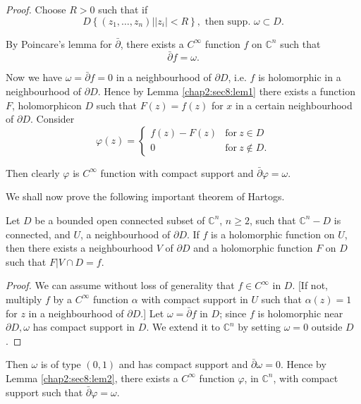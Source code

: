 \noindent\textit{Proof.}
  Choose $R > 0$ such that if
  \begin{equation*}
  D \left\{ (z_1, \ldots , z_n) \Big| |z_i| < R \right\}, \text{ then supp. }
  \omega \subset D.\tag*{$\Box$} 
  \end{equation*}

By Poincare's lemma for $\bar{\partial}$, there exists a $C^\infty$
function $f$ on $\mathbb{C}^n$ such that  
$$
\bar{\partial} f = \omega.
$$

Now we have $\omega = \bar{\partial} f = 0$ in a neighbourhood of
$\partial D$, i.e. $f$ is holomorphic in a neighbourhood of $\partial
D$. Hence by Lemma \ref{chap2:sec8:lem1} there exists a function $F$,
holomorphic\pageoriginale on $D$ 
such that $F(z) = f(z)$ for $x$ in a certain neighbourhood of
$\partial D$. Consider 
$$
\varphi (z) = \begin{cases} f(z) - F (z) & \text{for}~
  z \in D \\0 & \text{for}~ z \notin D. 
\end{cases}
$$ 

Then clearly $\varphi$ is
$C^\infty$ function with compact support and $\bar{\partial} \varphi =
\omega$. 

We shall now prove the following important theorem of Hartogs.

\setcounter{theorem}{0}
\begin{theorem}[Hartogs]\label{chap2:sec8:thm1}%
  Let $D$ be a bounded open connected subset of $\mathbb{C}^n$, $n
  \geq 2$, such that  $\mathbb{C}^n - D$ is connected, and $U$, a
  neighbourhood of $\partial D$. If $f$ is a holomorphic function on
  $U$, then there exists a neighbourhood $V$ of $\partial D$ and a
  holomorphic function $F$ on $D$ such that $F | V \cap D = f$. 
\end{theorem}

\begin{proof}
  We can assume without loss of generality that $f \in C^\infty$ in
  $D$. [If not, multiply $f$ by a $C^\infty$ function $\alpha$ with
    compact support in $U$ such that $\alpha(z) = 1$ for $z$ in a
    neighbourhood of $\partial D$.] Let $\omega = \bar{\partial} f$ in
  $D$;  since $f$ is holomorphic near $\partial D, \omega$ has compact
  support in $D$. We extend it to $\mathbb{C}^n$ by setting $\omega =
  0$ outside $D$. 
\end{proof} 
 
 Then $\omega$ is of type $(0,1)$ and has compact support and
 $\bar{\partial} \omega = 0$. Hence by Lemma \ref{chap2:sec8:lem2}, there exists a
 $C^\infty$ function $\varphi$, in $\mathbb{C}^n$, with compact
 support such that $\bar{\partial} \varphi = \omega$. 
 
